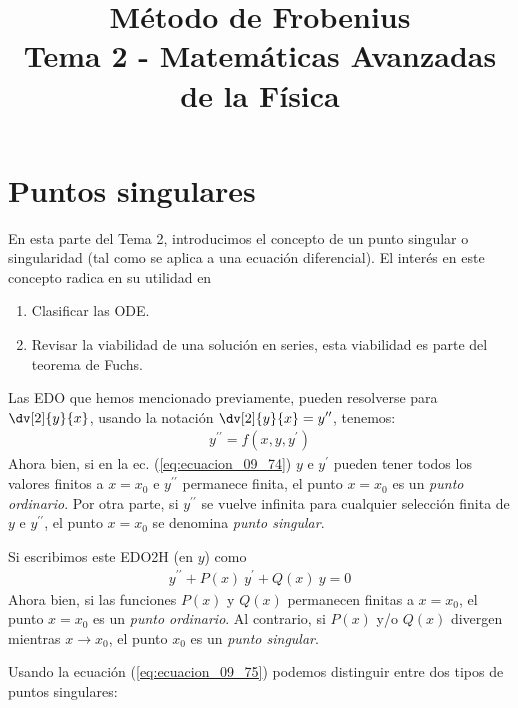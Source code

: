 
\title{Método de Frobenius \\ \large {Tema 2 - Matemáticas Avanzadas de la Física}\vspace{-1.5\baselineskip}}
\date{}
\author{}

\maketitle
\fontsize{14}{14}\selectfont
\section{Puntos singulares}
En esta parte del Tema 2, introducimos el concepto de un punto singular o singularidad (tal como se aplica a una ecuación diferencial). El interés en este concepto radica en su utilidad en
\begin{enumerate}
\item Clasificar las ODE.
\item Revisar la viabilidad de una solución en series, esta viabilidad es parte del teorema de Fuchs.
\end{enumerate}
\par
Las EDO que hemos mencionado previamente, pueden resolverse para $\displaystyle \dv[2]{y}{x}$, usando la notación $\displaystyle \dv[2]{y}{x} = y^{\prime \prime}$, tenemos:
\begin{align}
y^{\prime \prime} = f(x, y, y^{\prime})
\label{eq:ecuacion_09_74}
\end{align}
Ahora bien, si en la ec. (\ref{eq:ecuacion_09_74}) $y$ e $y^{\prime}$ pueden tener todos los valores finitos a $x = x_{0}$ e $y^{\prime \prime}$ permanece finita, el punto $x = x_{0}$ es un \emph{punto ordinario}. Por otra parte, si $y^{\prime \prime}$ se vuelve infinita para cualquier selección finita de $y$ e  $y^{\prime \prime}$, el punto $x = x_{0}$ se denomina \emph{punto singular}.
\par
Si escribimos este EDO2H (en $y$) como
\begin{align}
y^{\prime \prime} + P(x) \: y^{\prime} + Q(x) \: y = 0
\label{eq:ecuacion_09_75}
\end{align}
Ahora bien, si las funciones $P(x)$ y $Q(x)$ permanecen finitas a $x = x_{0}$, el punto $x = x_{0}$ es un \emph{punto ordinario}. Al contrario, si $P(x)$ y/o $Q(x)$ divergen mientras $x \to x_{0}$, el punto $x_{0}$ es un \emph{punto singular}.
\par
Usando la ecuación (\ref{eq:ecuacion_09_75}) podemos distinguir entre dos tipos de puntos singulares:
